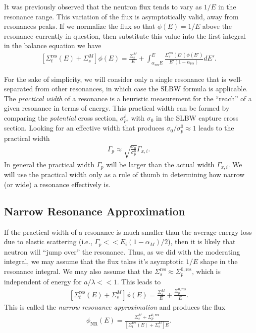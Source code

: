 \documentclass[11pt]{article}
\begin{document}
It was previously observed that the neutron flux tends to vary as \(1/E\) in the resonance range.  This variation of the flux is asymptotically valid, away from resonances peaks.  If we normalize the flux so that \(\phi(E) = 1/E\) above the resonance currently in question, then substitute this value into the first integral in the balance equation we have
\begin{align}
  \left[ \Sigma_t^\text{res}(E) + \Sigma_s^M \right] \phi(E)
  = \frac{\Sigma_s^M}{E} +
    \int_{\alpha_\text{res} E}^E \frac{\Sigma_s^\text{res}(E') \phi(E')}{E'(1-\alpha_\text{res})} dE'.
\end{align}

For the sake of simplicity, we will consider only a single resonance that is well-separated from other resonances, in which case the SLBW formula is applicable.  The \emph{practical width} of a resonance is a heuristic measurement for the ``reach'' of a given resonance in terms of energy.  This practical width can be formed by comparing the \emph{potential} cross section, \(\sigma_p^\ell\), with \(\sigma_0\) in the SLBW capture cross section.  Looking for an effective width that produces \(\sigma_0/\sigma_p^0 \approx 1\) leads to the practical width
\begin{align}
  \Gamma_p \approx \sqrt{\frac{\sigma_0}{\sigma_p^0}} \Gamma_{x,i}.
\end{align}
In general the practical width \(\Gamma_p\) will be larger than the actual width \(\Gamma_{x,i}\).  We will use the practical width only as a rule of thumb in determining how narrow (or wide) a resonance effectively is.

\subsection{Narrow Resonance Approximation}
\label{sec:orgheadline10}
If the practical width of a resonance is much smaller than the average energy loss due to elastic scattering (i.e., \(\Gamma_p << E_i(1-\alpha_M)/2\)), then it is likely that neutron will ``jump over'' the resonance.  Thus, as we did with the moderating integral, we may assume that the flux takes it's asymptotic \(1/E\) shape in the resonance integral.  We may also assume that the \(\Sigma_s^\text{res} \approx \Sigma_p^{0,\text{res}}\), which is independent of energy for \(a / \lambda << 1\).  This leads to
\begin{align}
  \left[ \Sigma_t^\text{res}(E) + \Sigma_s^M \right] \phi(E)
  = \frac{\Sigma_s^M}{E}
  + \frac{\Sigma_p^{0,\text{res}}}{E}.
\end{align}
This is called the \emph{narrow resonance approximation} and produces the flux
\begin{align}
  \phi_\text{NR}(E)
  = \frac{\Sigma_s^M + \Sigma_p^{0,\text{res}}}{\left[ \Sigma_t^\text{res}(E) + \Sigma_s^M \right]E}.
\end{align}
\end{document}
